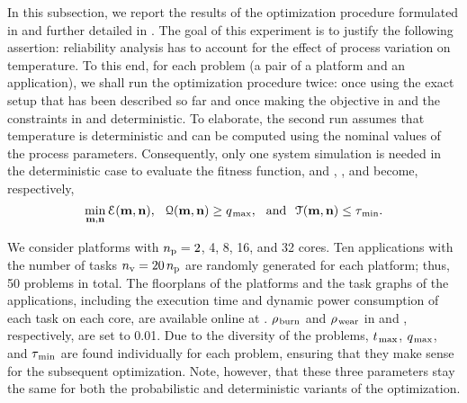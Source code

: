 In this subsection, we report the results of the optimization procedure formulated in  and further detailed in .
The goal of this experiment is to justify the following assertion: reliability analysis has to account for the effect of process variation on temperature.
To this end, for each problem (a pair of a platform and an application), we shall run the optimization procedure twice: once using the exact setup that has been described so far and once making the objective in  and the constraints in  and  deterministic.
To elaborate, the second run assumes that temperature is deterministic and can be computed using the nominal values of the process parameters.
Consequently, only one system simulation is needed in the deterministic case to evaluate the fitness function, and , , and  become, respectively,
\[
  \min_{\mathbf{m}, \mathbf{n}} \EuScript{E}(\mathbf{m}, \mathbf{n}), \hspace{0.7em} \EuScript{Q}(\mathbf{m}, \mathbf{n}) \geq q_{\text{\kern0.1emmax}}, \hspace{0.7em} \text{and} \hspace{0.7em} \EuScript{T}(\mathbf{m}, \mathbf{n}) \leq \tau_{\text{\kern0.1emmin}}.
\]


We consider platforms with ${n_\text{p}} = 2$, 4, 8, 16, and 32 cores.
Ten applications with the number of tasks ${n_\text{v}} = 20 \, {n_\text{p}}$ are randomly generated for each platform; thus, 50 problems in total.
The floorplans of the platforms and the task graphs of the applications, including the execution time and dynamic power consumption of each task on each core, are available online at \cite{sources}.
$\rho_{\text{\kern0.1emburn}}$ and $\rho_{\text{\kern0.1emwear}}$ in  and , respectively, are set to 0.01.
Due to the diversity of the problems, $t_{\text{\kern0.1emmax}}$, $q_{\text{\kern0.1emmax}}$, and $\tau_{\text{\kern0.1emmin}}$ are found individually for each problem, ensuring that they make sense for the subsequent optimization.
Note, however, that these three parameters stay the same for both the probabilistic and deterministic variants of the optimization.

